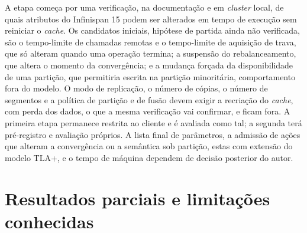 A etapa começa por uma verificação, na documentação e em \emph{cluster} local, de quais atributos do Infinispan 15 podem ser alterados em tempo de execução sem reiniciar o \emph{cache}. Os candidatos iniciais, hipótese de partida ainda não verificada, são o tempo-limite de chamadas remotas e o tempo-limite de aquisição de trava, que só alteram quando uma operação termina; a suspensão do rebalanceamento, que altera o momento da convergência; e a mudança forçada da disponibilidade de uma partição, que permitiria escrita na partição minoritária, comportamento fora do modelo. O modo de replicação, o número de cópias, o número de segmentos e a política de partição e de fusão devem exigir a recriação do \emph{cache}, com perda dos dados, o que a mesma verificação vai confirmar, e ficam fora. A primeira etapa permanece restrita ao cliente e é avaliada como tal; a segunda terá pré-registro e avaliação próprios. A lista final de parâmetros, a admissão de ações que alteram a convergência ou a semântica sob partição, estas com extensão do modelo TLA+, e o tempo de máquina dependem de decisão posterior do autor.

\section{Resultados parciais e limitações conhecidas}
\label{sec-resultados-parciais}

